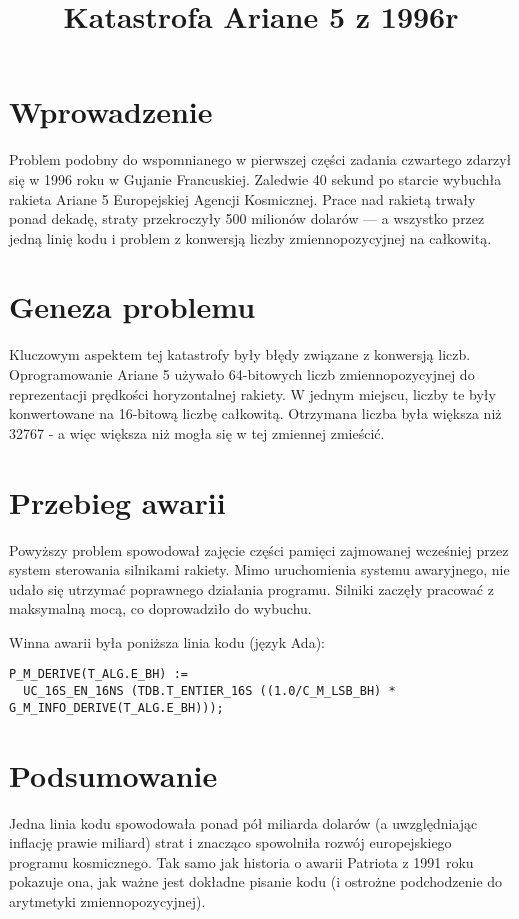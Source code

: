 \documentclass{article}
\begin{document}
\title{Katastrofa Ariane 5 z 1996r}
\author{}
\date{}

\maketitle

\section*{Wprowadzenie}
Problem podobny do wspomnianego w pierwszej części zadania czwartego zdarzył się w 1996 roku w Gujanie Francuskiej. Zaledwie 40 sekund po starcie wybuchła rakieta Ariane 5 Europejskiej Agencji Kosmicznej. Prace nad rakietą trwały ponad dekadę, straty przekroczyły 500 milionów dolarów --- a wszystko przez jedną linię kodu i problem z konwersją liczby zmiennopozycyjnej na całkowitą.

\section*{Geneza problemu}
Kluczowym aspektem tej katastrofy były błędy związane z konwersją liczb. Oprogramowanie Ariane 5 używało 64-bitowych liczb zmiennopozycyjnej do reprezentacji prędkości horyzontalnej rakiety. W jednym miejscu, liczby te były konwertowane na 16-bitową liczbę całkowitą. Otrzymana liczba była większa niż 32767 - a więc większa niż mogła się w tej zmiennej zmieścić.

\section*{Przebieg awarii}
Powyższy problem spowodował zajęcie części pamięci zajmowanej wcześniej przez system sterowania silnikami rakiety. Mimo uruchomienia systemu awaryjnego, nie udało się utrzymać poprawnego działania programu. Silniki zaczęły pracować z maksymalną mocą, co doprowadziło do wybuchu.

Winna awarii była poniższa linia kodu (język Ada):
\begin{verbatim}
P_M_DERIVE(T_ALG.E_BH) := 
  UC_16S_EN_16NS (TDB.T_ENTIER_16S ((1.0/C_M_LSB_BH) * G_M_INFO_DERIVE(T_ALG.E_BH)));
\end{verbatim}

\section*{Podsumowanie}

Jedna linia kodu spowodowała ponad pół miliarda dolarów (a uwzględniając inflację prawie miliard) strat i znacząco spowolniła rozwój europejskiego programu kosmicznego. Tak samo jak historia o awarii Patriota z 1991 roku pokazuje ona, jak ważne jest dokładne pisanie kodu (i ostrożne podchodzenie do arytmetyki zmiennopozycyjnej).
\end{document}
